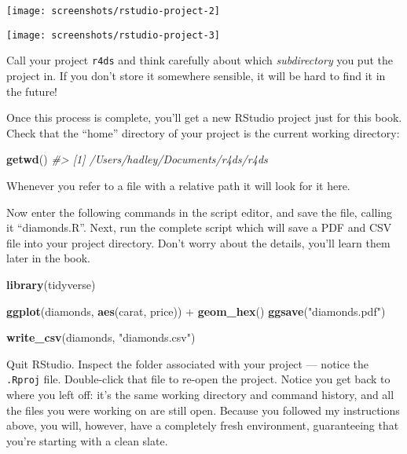 \documentclass[]{book}
\newenvironment{Shaded}{\begin{snugshade}}{\end{snugshade}}
\newcommand{\KeywordTok}[1]{\textcolor[rgb]{0.13,0.29,0.53}{\textbf{{#1}}}}
\newcommand{\StringTok}[1]{\textcolor[rgb]{0.31,0.60,0.02}{{#1}}}
\newcommand{\CommentTok}[1]{\textcolor[rgb]{0.56,0.35,0.01}{\textit{{#1}}}}
\newcommand{\NormalTok}[1]{{#1}}
\begin{document}
\begin{center}\texttt{[image: screenshots/rstudio-project-2]} \end{center}

\begin{center}\texttt{[image: screenshots/rstudio-project-3]} \end{center}

Call your project \texttt{r4ds} and think carefully about which
\emph{subdirectory} you put the project in. If you don't store it
somewhere sensible, it will be hard to find it in the future!

Once this process is complete, you'll get a new RStudio project just for
this book. Check that the ``home'' directory of your project is the
current working directory:

\begin{Shaded}
\begin{Highlighting}[]
\KeywordTok{getwd}\NormalTok{()}
\CommentTok{#> [1] /Users/hadley/Documents/r4ds/r4ds}
\end{Highlighting}
\end{Shaded}

Whenever you refer to a file with a relative path it will look for it
here.

Now enter the following commands in the script editor, and save the
file, calling it ``diamonds.R''. Next, run the complete script which
will save a PDF and CSV file into your project directory. Don't worry
about the details, you'll learn them later in the book.

\begin{Shaded}
\begin{Highlighting}[]
\KeywordTok{library}\NormalTok{(tidyverse)}

\KeywordTok{ggplot}\NormalTok{(diamonds, }\KeywordTok{aes}\NormalTok{(carat, price)) +}\StringTok{ }
\StringTok{  }\KeywordTok{geom_hex}\NormalTok{()}
\KeywordTok{ggsave}\NormalTok{(}\StringTok{"diamonds.pdf"}\NormalTok{)}

\KeywordTok{write_csv}\NormalTok{(diamonds, }\StringTok{"diamonds.csv"}\NormalTok{)}
\end{Highlighting}
\end{Shaded}

Quit RStudio. Inspect the folder associated with your project --- notice
the \texttt{.Rproj} file. Double-click that file to re-open the project.
Notice you get back to where you left off: it's the same working
directory and command history, and all the files you were working on are
still open. Because you followed my instructions above, you will,
however, have a completely fresh environment, guaranteeing that you're
starting with a clean slate.
\end{document}
